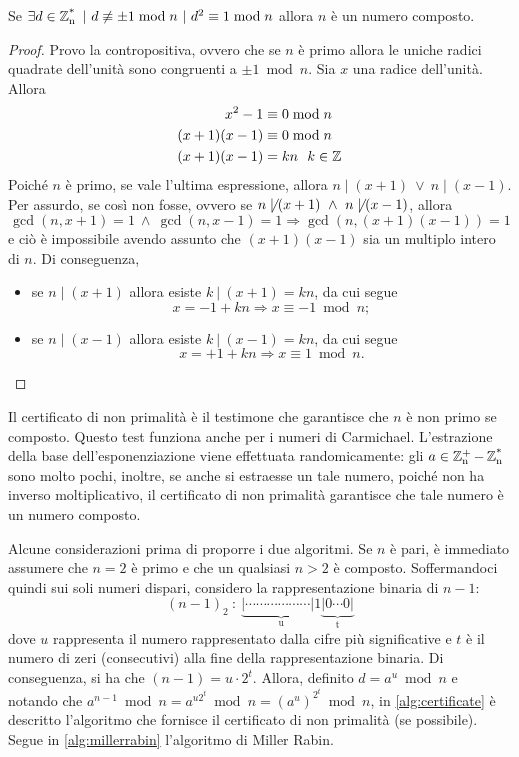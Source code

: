\begin{teorema}
Se $\exists d\in\operatorname*{\mathbb{Z}_n^*}\ |\ d \not\equiv \pm 1\bmod n\ |\ d^2\equiv 1\bmod n $ allora $n$ è un numero composto.
\end{teorema}
\begin{proof}
Provo la contropositiva, ovvero che se $n$ è primo allora le uniche radici quadrate dell'unità sono congruenti a $\pm 1\bmod n$. Sia $x$ una radice dell'unità. Allora
\begin{align*}
x^2-1 &\equiv 0\bmod n \\
(x+1)(x-1) &\equiv 0\bmod n \\
(x+1)(x-1) &= kn\ \ k\in\operatorname*{\mathbb{Z}}
\end{align*}
Poiché $n$ è primo, se vale l'ultima espressione, allora $n\mid(x+1)\ \lor\ n\mid(x-1)$. Per assurdo, se così non fosse, ovvero se $n \not\mid (x+1)\ \land\ n \not\mid (x-1)$, allora 
\[
\gcd(n,x+1)=1\ \land\ \gcd(n,x-1)=1 \Rightarrow \gcd(n, (x+1)(x-1))=1
\]
e ciò è impossibile avendo assunto che $(x+1)(x-1)$ sia un multiplo intero di $n$.
Di conseguenza,
\begin{itemize}
\item se $n\mid(x+1)$ allora esiste $k\ |\ (x+1)=kn$, da cui segue 
\[
x=-1+kn \Rightarrow x \equiv -1\bmod n;
\]
\item se $n\mid(x-1)$ allora esiste $k\ |\ (x-1)=kn$, da cui segue 
\[
x=+1+kn \Rightarrow x \equiv 1\bmod n.
\]
\end{itemize}
\end{proof}

Il certificato di non primalità è il testimone che garantisce che $n$ è non primo se composto. Questo test funziona anche per i numeri di Carmichael. L'estrazione della base dell'esponenziazione viene effettuata randomicamente: gli $a\in\operatorname*{\mathbb{Z}_n^+} -\operatorname*{\mathbb{Z}_n^*}$ sono molto pochi, inoltre, se anche si estraesse un tale numero, poiché non ha inverso moltiplicativo, il certificato di non primalità garantisce che tale numero è un numero composto.

Alcune considerazioni prima di proporre i due algoritmi. Se $n$ è pari, è immediato assumere che $n=2$ è primo e che un qualsiasi $n>2$ è composto. Soffermandoci quindi sui soli numeri dispari, considero la rappresentazione binaria di $n-1$:
\[
(n-1)_2\ :\ \underbrace{|\cdots \cdots \cdots \cdots \cdots \cdots |1}_\text{u} \underbrace{|0 \cdots 0 |}_\text{t}
\]
dove $u$ rappresenta il numero rappresentato dalla cifre più significative e $t$ è il numero di zeri (consecutivi) alla fine della rappresentazione binaria. Di conseguenza, si ha che $(n-1)=u\cdot 2^{t}$. Allora, definito $d=a^u\bmod n$ e notando che $a^{n-1}\bmod n=a^{u2^t}\bmod n=(a^u)^{2^t}\bmod n$, in \ref{alg:certificate} è descritto l'algoritmo che fornisce il certificato di non primalità (se possibile). Segue in \ref{alg:millerrabin} l'algoritmo di Miller Rabin.

